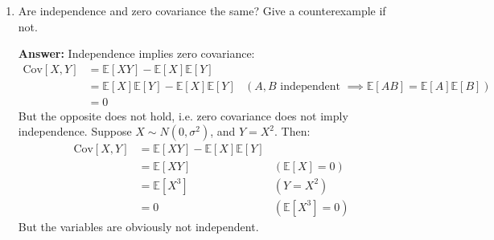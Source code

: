 \documentclass{article}
\newenvironment{QandA}{\begin{enumerate}[label=\arabic*.]}{\end{enumerate}}
\newenvironment{answer}{\par\normalfont \textbf{Answer:}}{}
\newcommand{\Exp}[1]{\mathbb{E}\left[ #1 \right]}
\newcommand{\Cov}[1]{\text{Cov}\left[ #1 \right]}
\begin{document}
\begin{QandA}
\begin{answer}
        The fourth standardized moment, called \textit{kurtosis}, measures the combined size of the tails relative to the whole distribution:
        \begin{align*}
            \bar{m}_4 = \Exp{\left( \frac{X - \mu_x}{\sigma_x} \right)^4} = \int_{-\infty}^{\infty} \left( \frac{x - \mu_x}{\sigma_x}\right)^4 p(x) dx
        \end{align*}
        Unlike skewness’s cubic term which preserves sign, kurtosis’s even power means that the metric is always positive and that long tails on either side dominate the calculation. Just as we saw with skewness, kurtosis’s fourth power means that standard scores less than 1—again, data near the peak of the distribution—only marginally contribute to the total calculation. In other words, kurtosis measures tailedness, not peakedness. \\\\
        What about moments of higher order? The short answer is, for $k \ge 5$:
        \begin{itemize}
            \item if $k$ is odd, then this standardized moment essentially captures nearly the same information as the skewness (since it preserves sign), with the only difference being the magnitude with which we penalize outliers far away from the center. 
            \item Similarly, if $k$ is even, then this standardized moment captures nearly the same information as kurtosis, since it disregards the sign of the terms. 
        \end{itemize}

        (Source: \href{https://gregorygundersen.com/blog/2020/04/11/moments/}{this awesome blog} from Gregory Gundersen)
    \end{answer}

    \item Are independence and zero covariance the same? Give a counterexample if not. 
    \begin{answer}
        Independence implies zero covariance:
        \begin{align*}
            \Cov{X, Y} &= \Exp{XY} - \Exp{X}\Exp{Y} \\
            &= \Exp{X}\Exp{Y} - \Exp{X}\Exp{Y} & (A, B \text{ independent } \implies \Exp{AB} = \Exp{A}\Exp{B})\\
            &= 0
        \end{align*}
        But the opposite does not hold, i.e. zero covariance does not imply independence. Suppose $X \sim N(0, \sigma^2)$, and $Y = X^2$. Then:
        \begin{align*}
            \Cov{X, Y} &= \Exp{XY} - \Exp{X}\Exp{Y}  \\
            &= \Exp{XY} & (\Exp{X} = 0) \\
            &= \Exp{X^3} & (Y = X^2)\\
            &= 0  & (\Exp{X^3} = 0)
        \end{align*}
        But the variables are obviously not independent.
        

\end{answer}
\end{QandA}
\end{document}
